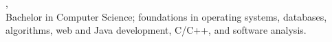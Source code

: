 \textbf{\EducationName}, \EducationUniversity \hfill \EducationDates\\
Bachelor in Computer Science; foundations in operating systems, databases, algorithms, web and Java development, C/C++, and software analysis.
